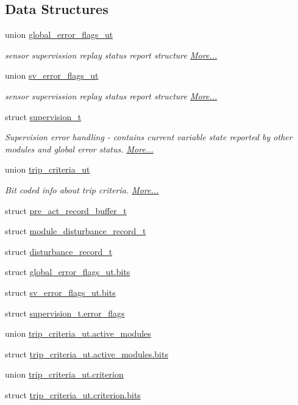 \subsection*{Data Structures}
\begin{DoxyCompactItemize}
\item 
union \hyperlink{a00022_d1/d0b/a00452}{global\+\_\+error\+\_\+flags\+\_\+ut}
\begin{DoxyCompactList}\small\item\em sensor supervission replay status report structure  \hyperlink{a00022_d1/d0b/a00452}{More...}\end{DoxyCompactList}\item 
union \hyperlink{a00022_d2/d5a/a00792}{sv\+\_\+error\+\_\+flags\+\_\+ut}
\begin{DoxyCompactList}\small\item\em sensor supervission replay status report structure  \hyperlink{a00022_d2/d5a/a00792}{More...}\end{DoxyCompactList}\item 
struct \hyperlink{a00022_d3/daf/a00790}{supervision\+\_\+t}
\begin{DoxyCompactList}\small\item\em Supervision error handling -\/ contains current variable state reported by other modules and global error status.  \hyperlink{a00022_d3/daf/a00790}{More...}\end{DoxyCompactList}\item 
union \hyperlink{a00022_d8/d64/a00828}{trip\+\_\+criteria\+\_\+ut}
\begin{DoxyCompactList}\small\item\em Bit coded info about trip criteria.  \hyperlink{a00022_d8/d64/a00828}{More...}\end{DoxyCompactList}\item 
struct \hyperlink{a00022_da/dc3/a00657}{pre\+\_\+act\+\_\+record\+\_\+buffer\+\_\+t}
\item 
struct \hyperlink{a00028}{module\+\_\+disturbance\+\_\+record\+\_\+t}
\item 
struct \hyperlink{a00022_db/dbc/a00395}{disturbance\+\_\+record\+\_\+t}
\item 
struct \hyperlink{a00022_da/dc3/a00453}{global\+\_\+error\+\_\+flags\+\_\+ut.\+bits}
\item 
struct \hyperlink{a00022_d4/dd7/a00793}{sv\+\_\+error\+\_\+flags\+\_\+ut.\+bits}
\item 
struct \hyperlink{a00022_d4/d45/a00791}{supervision\+\_\+t.\+error\+\_\+flags}
\item 
union \hyperlink{a00022_d1/dea/a00829}{trip\+\_\+criteria\+\_\+ut.\+active\+\_\+modules}
\item 
struct \hyperlink{a00022_d9/daf/a00830}{trip\+\_\+criteria\+\_\+ut.\+active\+\_\+modules.\+bits}
\item 
union \hyperlink{a00022_d7/d5f/a00831}{trip\+\_\+criteria\+\_\+ut.\+criterion}
\item 
struct \hyperlink{a00022_d0/d08/a00832}{trip\+\_\+criteria\+\_\+ut.\+criterion.\+bits}
\end{DoxyCompactItemize}
